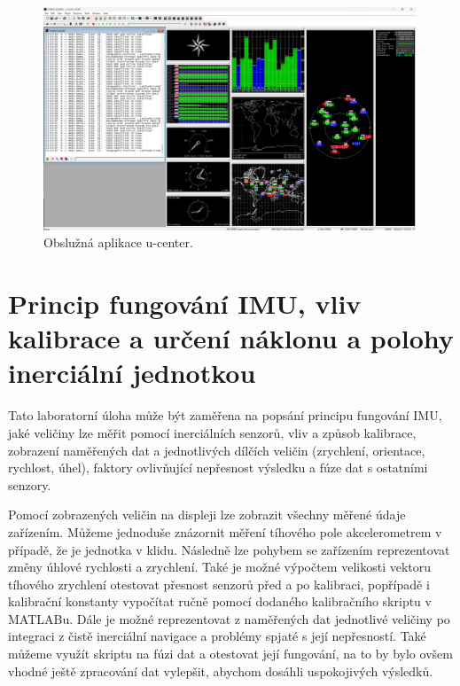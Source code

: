 \begin{figure}[h]
     \centering
         \includegraphics[width=0.99\textwidth]{obrazky/uCenter}
         \caption{Obslužná aplikace u-center.}
        \label{fig:uCenter}
\end{figure}

\section{Princip fungování IMU, vliv kalibrace a určení náklonu a polohy inerciální jednotkou}
Tato laboratorní úloha může být zaměřena na popsání principu fungování IMU, jaké veličiny lze měřit pomocí inerciálních senzorů, vliv a způsob kalibrace, zobrazení naměřených dat a jednotlivých dílčích veličin (zrychlení, orientace, rychlost, úhel), faktory ovlivňující nepřesnost výsledku a fúze dat s ostatními senzory. 

Pomocí zobrazených veličin na displeji lze zobrazit všechny měřené údaje zařízením. Můžeme jednoduše znázornit měření tíhového pole akcelerometrem v případě, že je jednotka v klidu. Následně lze pohybem se zařízením reprezentovat změny úhlové rychlosti a zrychlení. Také je možné výpočtem velikosti vektoru tíhového zrychlení otestovat přesnost senzorů před a po kalibraci, popřípadě i kalibrační konstanty vypočítat ručně pomocí dodaného kalibračního skriptu v MATLABu. Dále je možné reprezentovat z naměřených dat jednotlivé veličiny po integraci z čistě inerciální navigace a problémy spjaté s její nepřesností. Také můžeme využít skriptu na fúzi dat a otestovat její fungování, na to by bylo ovšem vhodné ještě zpracování dat vylepšit, abychom dosáhli uspokojivých výsledků.

